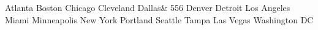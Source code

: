 Atlanta
Boston
Chicago
Cleveland
Dallas& 556
Denver
Detroit
Los Angeles
Miami
Minneapolis 
New York
Portland
Seattle
Tampa
Las Vegas
Washington DC
